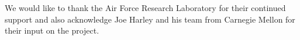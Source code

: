 \documentclass[a4paper]{spie}  %
\begin{document}
\acknowledgments     %
 
We would like to thank the Air Force Research Laboratory for their continued support and also acknowledge Joe Harley and his team from Carnegie Mellon for their input on the project. 


\end{document}
